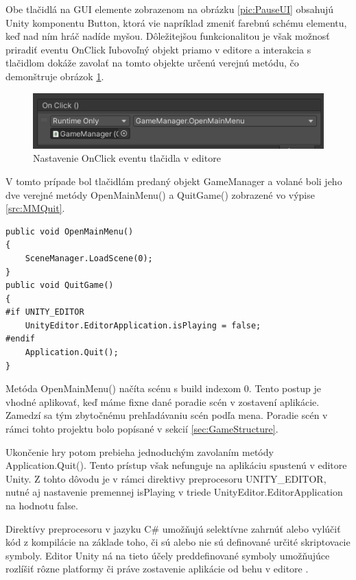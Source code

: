 \documentclass[slovak, master]{diploma}
\begin{document}
Obe tlačidlá na GUI elemente zobrazenom na obrázku \ref{pic:PauseUI} obsahujú Unity komponentu Button, ktorá vie napríklad zmeniť farebnú schému elementu, keď nad ním hráč nadíde myšou. Dôležitejšou funkcionalitou je však možnosť priradiť eventu OnClick ľubovoľný objekt priamo v editore a interakcia s tlačidlom dokáže zavolať na tomto objekte určenú verejnú metódu, čo demonštruje obrázok \ref{pic:OnClick}. 

\begin{figure}[!htbp]
	\centering
	\includegraphics[width=.8\textwidth]{Figures/OnClick.png}
	\caption{Nastavenie OnClick eventu tlačidla v editore}
	\label{pic:OnClick}
\end{figure}

V tomto prípade bol tlačidlám predaný objekt GameManager a volané boli jeho dve verejné metódy OpenMainMenu() a QuitGame() zobrazené vo výpise \ref{src:MMQuit}.

\vspace{8pt}
\begin{lstlisting}[label=src:MMQuit,caption={Metódy na návrat do hlavnej ponuky a ukončenie hry}]
public void OpenMainMenu()
{
    SceneManager.LoadScene(0);
}
public void QuitGame()
{
#if UNITY_EDITOR
    UnityEditor.EditorApplication.isPlaying = false;
#endif
    Application.Quit();
}
\end{lstlisting}

Metóda OpenMainMenu() načíta scénu s build indexom 0. Tento postup je vhodné aplikovať, keď máme fixne dané poradie scén v zostavení aplikácie. Zamedzí sa tým zbytočnému prehľadávaniu scén podľa mena. Poradie scén v rámci tohto projektu bolo popísané v sekcií \ref{sec:GameStructure}. 

Ukončenie hry potom prebieha jednoduchým zavolaním metódy Application.Quit(). Tento prístup však nefunguje na aplikáciu spustenú v editore Unity. Z tohto dôvodu je v rámci direktivy preprocesoru UNITY\_EDITOR, nutné aj nastavenie premennej isPlaying v triede UnityEditor.EditorApplication na hodnotu false. 

Direktívy preprocesoru v jazyku C\# umožňujú selektívne zahrnúť alebo vylúčiť kód z kompilácie na základe toho, či sú alebo nie sú definované určité skriptovacie symboly. Editor Unity ná na tieto účely preddefinované symboly umožňujúce rozlíšiť rôzne platformy či práve zostavenie aplikácie od behu v editore \cite{ConditionalCompilation}.
\end{document}
